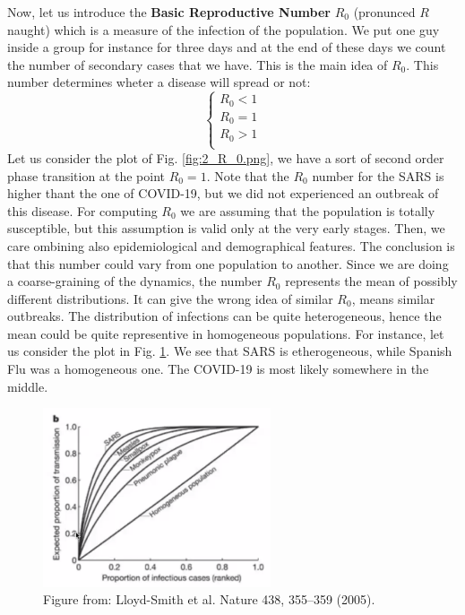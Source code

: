 \documentclass[../main/main.tex]{subfiles}
\begin{document}
Now, let us introduce the \textbf{Basic Reproductive Number} \( R_0 \) (pronunced \( R \) naught) which is a measure of the infection of the population. We put one guy inside a group for instance for three days and at the end of these days we count the number of secondary cases that we have. This is the main idea of \( R_0 \). This number determines wheter a disease will spread or not:
  \begin{equation}
    \begin{cases}
     R_0 < 1\\
     R_0 = 1\\
     R_0 > 1\\
    \end{cases}
  \end{equation}
Let us consider the plot of Fig. \ref{fig:2_R_0.png}, we have a sort of second order phase transition at the point \( R_0=1 \).
Note that the \( R_0 \) number for the SARS is higher thant the one of COVID-19, but we did not experienced an outbreak of this disease.
For computing \( R_0 \) we are assuming that the population is totally susceptible, but this assumption is valid only at the very early stages. Then, we care ombining also epidemiological and demographical features. The conclusion is that this number could vary from one population to another.
Since we are doing a coarse-graining of the dynamics, the number \( R_0 \) represents the mean of possibly different distributions. It can give the wrong idea of similar \( R_0 \), means similar outbreaks.
The distribution of infections can be quite heterogeneous, hence the mean could be quite representive in homogeneous populations. For instance, let us consider the plot in Fig. \ref{fig:3_outbreaks}. We see that SARS is etherogeneous, while Spanish Flu was a homogeneous one.
The COVID-19 is most likely somewhere in the middle.

\begin{figure}[h!]
\centering
\includegraphics[width=0.6\textwidth]{../lessons/image/02/3_outbreaks.png}
\caption{\label{fig:3_outbreaks} Figure from: Lloyd-Smith et al. Nature 438, 355–359 (2005).}
\end{figure}
\end{document}
